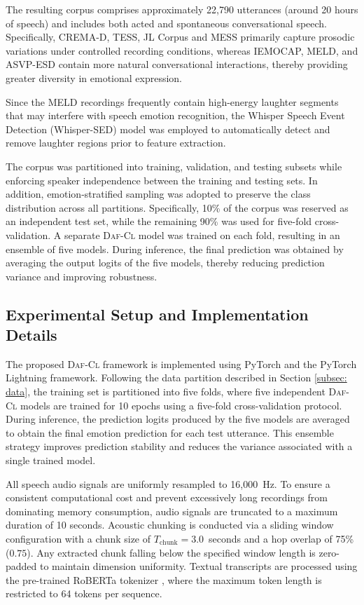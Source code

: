 The resulting corpus comprises approximately 22,790 utterances (around 20 hours of speech) and includes both acted and spontaneous conversational speech. Specifically, CREMA-D, TESS, JL Corpus and MESS primarily capture prosodic variations under controlled recording conditions, whereas IEMOCAP, MELD, and ASVP-ESD contain more natural conversational interactions, thereby providing greater diversity in emotional expression.

Since the MELD recordings frequently contain high-energy laughter segments that may interfere with speech emotion recognition, the Whisper Speech Event Detection (Whisper-SED) model \cite{Yuan2023} was employed to automatically detect and remove laughter regions prior to feature extraction.

The corpus was partitioned into training, validation, and testing subsets while enforcing speaker independence between the training and testing sets. In addition, emotion-stratified sampling was adopted to preserve the class distribution across all partitions. Specifically, 10\% of the corpus was reserved as an independent test set, while the remaining 90\% was used for five-fold cross-validation. A separate \textsc{Daf-Cl} model was trained on each fold, resulting in an ensemble of five models. During inference, the final prediction was obtained by averaging the output logits of the five models, thereby reducing prediction variance and improving robustness.

\subsection{Experimental Setup and Implementation Details}

The proposed \textsc{Daf-Cl} framework is implemented using PyTorch and the PyTorch Lightning framework. Following the data partition described in Section \ref{subsec: data}, the training set is partitioned into five folds, where five independent \textsc{Daf-Cl} models are trained for 10 epochs using a five-fold cross-validation protocol. During inference, the prediction logits produced by the five models are averaged to obtain the final emotion prediction for each test utterance. This ensemble strategy improves prediction stability and reduces the variance associated with a single trained model.

 All speech audio signals are uniformly resampled to 16,000~Hz. To ensure a consistent computational cost and prevent excessively long recordings from dominating memory consumption, audio signals are truncated to a maximum duration of 10 seconds. Acoustic chunking is conducted via a sliding window configuration with a chunk size of $T_{\text{chunk}} = 3.0$~seconds and a hop overlap of 75\% ($0.75$). Any extracted chunk falling below the specified window length is zero-padded to maintain dimension uniformity. Textual transcripts are processed using the pre-trained RoBERTa tokenizer \cite{liu2019roberta}, where the maximum token length is restricted to 64 tokens per sequence.

